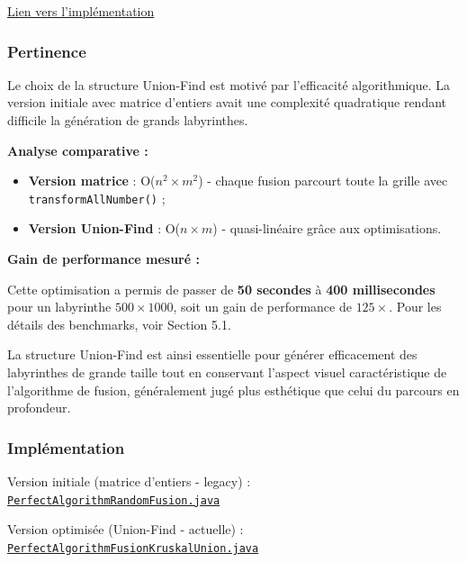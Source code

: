 \documentclass{butexFR}
\begin{document}
\href{https://gitlab.univ-lille.fr/sae302/2025/G2_SAE3.3/-/blob/master/labyrinth/src/main/java/fr/univlille/labyrinth/model/algorithm/PerfectAlgorithmFusionKruskalUnion.java?ref_type=heads}{Lien vers l'implémentation}

\subsubsection{Pertinence}

Le choix de la structure Union-Find est motivé par l'efficacité algorithmique. La version initiale avec matrice d'entiers avait une complexité quadratique rendant difficile la génération de grands labyrinthes.

\textbf{Analyse comparative :}
\begin{itemize}
    \item \textbf{Version matrice} : O($n^2 \times m^2$) - chaque fusion parcourt toute la grille avec \texttt{transformAllNumber()} ;
    \item \textbf{Version Union-Find} : O($n \times m$) - quasi-linéaire grâce aux optimisations.
\end{itemize}

\textbf{Gain de performance mesuré :}

Cette optimisation a permis de passer de \textbf{50 secondes} à \textbf{400 millisecondes} pour un labyrinthe $500 \times 1000$, soit un gain de performance de $125 \times$. Pour les détails des benchmarks, voir Section 5.1.

La structure Union-Find est ainsi essentielle pour générer efficacement des labyrinthes de grande taille tout en conservant l'aspect visuel caractéristique de l'algorithme de fusion, généralement jugé plus esthétique que celui du parcours en profondeur.

\subsubsection{Implémentation}

Version initiale (matrice d'entiers - legacy) : \href{https://gitlab.univ-lille.fr/sae302/2025/G2_SAE3.3/-/blob/master/labyrinth/src/main/java/fr/univlille/labyrinth/model/algorithm/PerfectAlgorithmRandomFusion.java?ref_type=heads}{\texttt{PerfectAlgorithmRandomFusion.java}}

Version optimisée (Union-Find - actuelle) : \href{https://gitlab.univ-lille.fr/sae302/2025/G2_SAE3.3/-/blob/master/labyrinth/src/main/java/fr/univlille/labyrinth/model/algorithm/PerfectAlgorithmFusionKruskalUnion.java?ref_type=heads}{\texttt{PerfectAlgorithmFusionKruskalUnion.java}}
\end{document}
